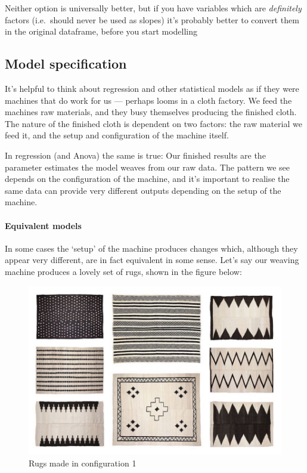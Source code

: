 \documentclass[]{article}
\let\oldparagraph\paragraph
\renewcommand{\paragraph}[1]{\oldparagraph{#1}\mbox{}}
\theoremstyle{definition}
\theoremstyle{definition}
\theoremstyle{definition}
\theoremstyle{remark}
\begin{document}
{Neither option is universally better, but if you have variables which
are \emph{definitely} factors (i.e.~should never be used as slopes) it's
probably better to convert them in the original dataframe, before you
start modelling}

\subsection*{Model specification}\label{parameterisation}

It's helpful to think about regression and other statistical models as
if they were machines that do work for us --- perhaps looms in a cloth
factory. We feed the machines raw materials, and they busy themselves
producing the finished cloth. The nature of the finished cloth is
dependent on two factors: the raw material we feed it, and the setup and
configuration of the machine itself.

In regression (and Anova) the same is true: Our finished results are the
parameter estimates the model weaves from our raw data. The pattern we
see depends on the configuration of the machine, and it's important to
realise the same data can provide very different outputs depending on
the setup of the machine.

\paragraph{Equivalent models}\label{equivalent-models}

In some cases the `setup' of the machine produces changes which,
although they appear very different, are in fact equivalent in some
sense. Let's say our weaving machine produces a lovely set of rugs,
shown in the figure below:

\begin{figure}
\centering
\includegraphics{media/rugs1.jpg}
\caption{Rugs made in configuration 1}
\end{figure}
\end{document}

